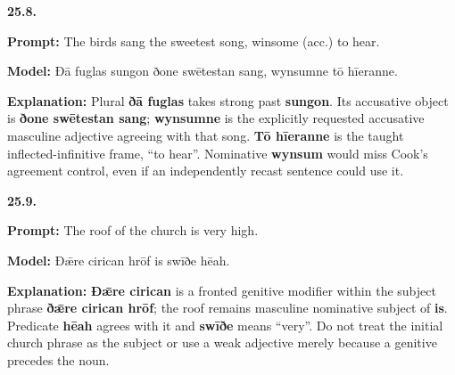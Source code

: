 \par\begin{minipage}{\linewidth}\raggedright
\textbf{25.8.}

\textbf{Prompt:} The birds sang the sweetest song, winsome (acc.) to hear.

\textbf{Model:} Ðā fuglas sungon ðone swētestan sang, wynsumne tō hīeranne.

\textbf{Explanation:} Plural \textbf{ðā fuglas} takes strong past \textbf{sungon}. Its accusative object is \textbf{ðone swētestan sang}; \textbf{wynsumne} is the explicitly requested accusative masculine adjective agreeing with that song. \textbf{Tō hīeranne} is the taught inflected-infinitive frame, “to hear”. Nominative \textbf{wynsum} would miss Cook’s agreement control, even if an independently recast sentence could use it.

\end{minipage}\par\addvspace{4pt}

\par\begin{minipage}{\linewidth}\raggedright
\textbf{25.9.}

\textbf{Prompt:} The roof of the church is very high.

\textbf{Model:} Ðǣre cirican hrōf is swīðe hēah.

\textbf{Explanation:} \textbf{Ðǣre cirican} is a fronted genitive modifier within the subject phrase \textbf{ðǣre cirican hrōf}; the roof remains masculine nominative subject of \textbf{is}. Predicate \textbf{hēah} agrees with it and \textbf{swīðe} means “very”. Do not treat the initial church phrase as the subject or use a weak adjective merely because a genitive precedes the noun.

\end{minipage}\par\addvspace{4pt}

